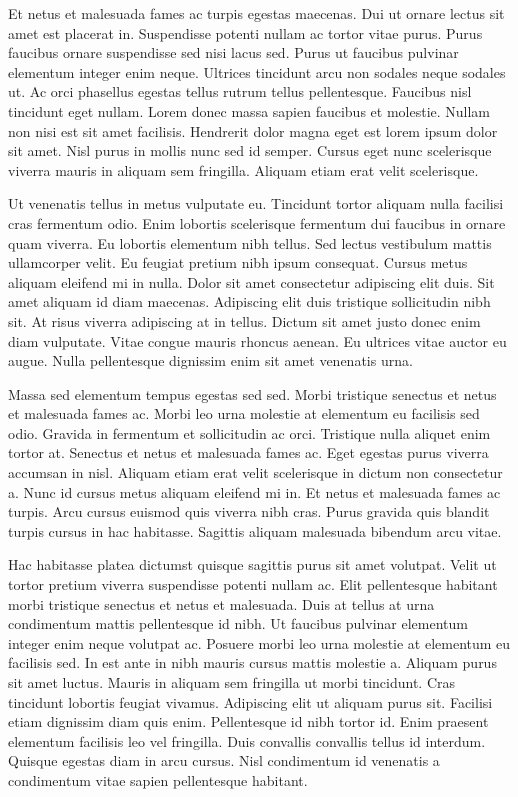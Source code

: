 \documentclass[11pt,a4paper]{article}
\begin{document}
Et netus et malesuada fames ac turpis egestas maecenas. Dui ut ornare lectus sit amet est placerat in. Suspendisse potenti nullam ac tortor vitae purus. Purus faucibus ornare suspendisse sed nisi lacus sed. Purus ut faucibus pulvinar elementum integer enim neque. Ultrices tincidunt arcu non sodales neque sodales ut. Ac orci phasellus egestas tellus rutrum tellus pellentesque. Faucibus nisl tincidunt eget nullam. Lorem donec massa sapien faucibus et molestie. Nullam non nisi est sit amet facilisis. Hendrerit dolor magna eget est lorem ipsum dolor sit amet. Nisl purus in mollis nunc sed id semper. Cursus eget nunc scelerisque viverra mauris in aliquam sem fringilla. Aliquam etiam erat velit scelerisque.

Ut venenatis tellus in metus vulputate eu. Tincidunt tortor aliquam nulla facilisi cras fermentum odio. Enim lobortis scelerisque fermentum dui faucibus in ornare quam viverra. Eu lobortis elementum nibh tellus. Sed lectus vestibulum mattis ullamcorper velit. Eu feugiat pretium nibh ipsum consequat. Cursus metus aliquam eleifend mi in nulla. Dolor sit amet consectetur adipiscing elit duis. Sit amet aliquam id diam maecenas. Adipiscing elit duis tristique sollicitudin nibh sit. At risus viverra adipiscing at in tellus. Dictum sit amet justo donec enim diam vulputate. Vitae congue mauris rhoncus aenean. Eu ultrices vitae auctor eu augue. Nulla pellentesque dignissim enim sit amet venenatis urna.

Massa sed elementum tempus egestas sed sed. Morbi tristique senectus et netus et malesuada fames ac. Morbi leo urna molestie at elementum eu facilisis sed odio. Gravida in fermentum et sollicitudin ac orci. Tristique nulla aliquet enim tortor at. Senectus et netus et malesuada fames ac. Eget egestas purus viverra accumsan in nisl. Aliquam etiam erat velit scelerisque in dictum non consectetur a. Nunc id cursus metus aliquam eleifend mi in. Et netus et malesuada fames ac turpis. Arcu cursus euismod quis viverra nibh cras. Purus gravida quis blandit turpis cursus in hac habitasse. Sagittis aliquam malesuada bibendum arcu vitae.

Hac habitasse platea dictumst quisque sagittis purus sit amet volutpat. Velit ut tortor pretium viverra suspendisse potenti nullam ac. Elit pellentesque habitant morbi tristique senectus et netus et malesuada. Duis at tellus at urna condimentum mattis pellentesque id nibh. Ut faucibus pulvinar elementum integer enim neque volutpat ac. Posuere morbi leo urna molestie at elementum eu facilisis sed. In est ante in nibh mauris cursus mattis molestie a. Aliquam purus sit amet luctus. Mauris in aliquam sem fringilla ut morbi tincidunt. Cras tincidunt lobortis feugiat vivamus. Adipiscing elit ut aliquam purus sit. Facilisi etiam dignissim diam quis enim. Pellentesque id nibh tortor id. Enim praesent elementum facilisis leo vel fringilla. Duis convallis convallis tellus id interdum. Quisque egestas diam in arcu cursus. Nisl condimentum id venenatis a condimentum vitae sapien pellentesque habitant.
\end{document}
